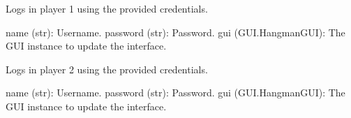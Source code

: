 \documentclass[letterpaper,10pt,english]{sphinxmanual}
\begin{document}

\begin{fulllineitems}
\label{\detokenize{modules:Game_Logic.login_player1}}
\pysigstartsignatures
{}
\pysigstopsignatures
\sphinxAtStartPar
Logs in player 1 using the provided credentials.
\begin{description}
\sphinxAtStartPar
name (str): Username.
password (str): Password.
gui (GUI.HangmanGUI): The GUI instance to update the interface.

\end{description}

\end{fulllineitems}


\begin{fulllineitems}
\label{\detokenize{modules:Game_Logic.login_player2}}
\pysigstartsignatures
{}
\pysigstopsignatures
\sphinxAtStartPar
Logs in player 2 using the provided credentials.
\begin{description}
\sphinxAtStartPar
name (str): Username.
password (str): Password.
gui (GUI.HangmanGUI): The GUI instance to update the interface.

\end{description}

\end{fulllineitems}

\end{document}
